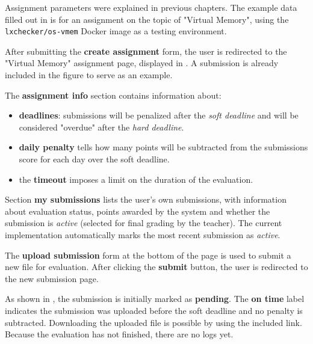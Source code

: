 Assignment parameters were explained in previous chapters. The example data filled out in  is for an assignment on the topic of "Virtual Memory", using the \texttt{lxchecker/os-vmem} Docker image as a testing environment.


After submitting the \textbf{create assignment} form, the user is redirected to the "Virtual Memory" assignment page, displayed in . A submission is already included in the figure to serve as an example.

The \textbf{assignment info} section contains information about:
\begin{itemize}
	\item \textbf{deadlines}: submissions will be penalized after the \textit{soft deadline} and will be considered "overdue" after the \textit{hard deadline}.
	\item \textbf{daily penalty} tells how many points will be subtracted from the submissions score for each day over the soft deadline.
	\item the \textbf{timeout} imposes a limit on the duration of the evaluation.
\end{itemize}

Section \textbf{my submissions} lists the user's own submissions, with information about evaluation status, points awarded by the system and whether the submission is \textit{active} (selected for final grading by the teacher). The current implementation automatically marks the most recent submission as \textit{active}.

The \textbf{upload submission} form at the bottom of the page is used to submit a new file for evaluation. After clicking the \textbf{submit} button, the user is redirected to the new submission page.


As shown in , the submission is initially marked as \textbf{pending}. The \textbf{on time} label indicates the submission was uploaded before the soft deadline and no penalty is subtracted. Downloading the uploaded file is possible by using the included link. Because the evaluation has not finished, there are no logs yet.

